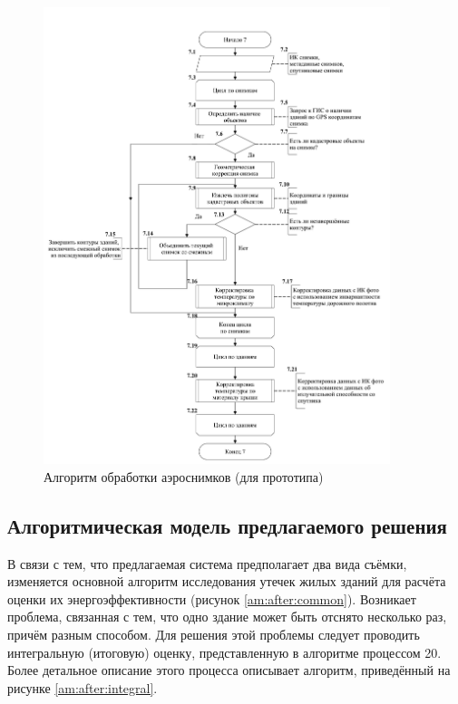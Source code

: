	\begin{figure}[h!]
      \centering
      \includegraphics[width=0.9\textwidth]{images/am/am01_before}
      \caption{Алгоритм обработки аэроснимков (для прототипа)}
      \label{am:before:aero}
    \end{figure}    



\subsection{Алгоритмическая модель предлагаемого решения}
\label{sec:models:algo:after}

\par
	В связи с тем, что предлагаемая система предполагает два вида съёмки, изменяется основной алгоритм исследования утечек жилых зданий для расчёта оценки их энергоэффективности (рисунок \ref{am:after:common}). Возникает проблема, связанная с тем, что одно здание может быть отснято несколько раз, причём разным способом. Для решения этой проблемы следует проводить интегральную (итоговую) оценку, представленную в алгоритме процессом 20. Более детальное описание этого процесса описывает алгоритм, приведённый на рисунке 
	\ref{am:after:integral}.

